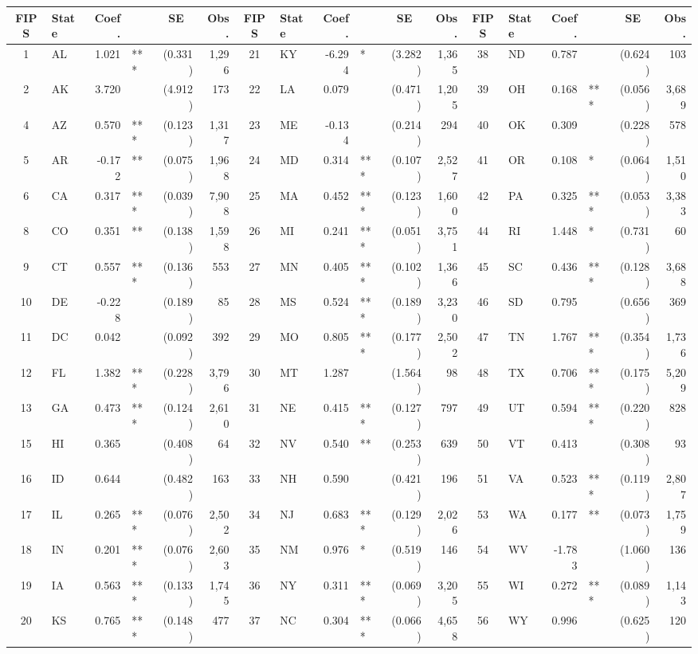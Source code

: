 \begin{tabular}{c l r l r r | c l r l r r | c l r l r r}
\hline
FIPS & State & Coef. & & \multicolumn{1}{c}{SE} & Obs. & FIPS & State & Coef. & & \multicolumn{1}{c}{SE} & Obs. & FIPS & State & Coef. & & \multicolumn{1}{c}{SE} & Obs. \\
\hline
1 & AL & 1.021 & *** & (0.331) & 1,296 & 21 & KY & -6.294 & * & (3.282) & 1,365 & 38 & ND & 0.787 &  & (0.624) & 103 \\
2 & AK & 3.720 &  & (4.912) & 173 & 22 & LA & 0.079 &  & (0.471) & 1,205 & 39 & OH & 0.168 & *** & (0.056) & 3,689 \\
4 & AZ & 0.570 & *** & (0.123) & 1,317 & 23 & ME & -0.134 &  & (0.214) & 294 & 40 & OK & 0.309 &  & (0.228) & 578 \\
5 & AR & -0.172 & ** & (0.075) & 1,968 & 24 & MD & 0.314 & *** & (0.107) & 2,527 & 41 & OR & 0.108 & * & (0.064) & 1,510 \\
6 & CA & 0.317 & *** & (0.039) & 7,908 & 25 & MA & 0.452 & *** & (0.123) & 1,600 & 42 & PA & 0.325 & *** & (0.053) & 3,383 \\
8 & CO & 0.351 & ** & (0.138) & 1,598 & 26 & MI & 0.241 & *** & (0.051) & 3,751 & 44 & RI & 1.448 & * & (0.731) & 60 \\
9 & CT & 0.557 & *** & (0.136) & 553 & 27 & MN & 0.405 & *** & (0.102) & 1,366 & 45 & SC & 0.436 & *** & (0.128) & 3,688 \\
10 & DE & -0.228 &  & (0.189) & 85 & 28 & MS & 0.524 & *** & (0.189) & 3,230 & 46 & SD & 0.795 &  & (0.656) & 369 \\
11 & DC & 0.042 &  & (0.092) & 392 & 29 & MO & 0.805 & *** & (0.177) & 2,502 & 47 & TN & 1.767 & *** & (0.354) & 1,736 \\
12 & FL & 1.382 & *** & (0.228) & 3,796 & 30 & MT & 1.287 &  & (1.564) & 98 & 48 & TX & 0.706 & *** & (0.175) & 5,209 \\
13 & GA & 0.473 & *** & (0.124) & 2,610 & 31 & NE & 0.415 & *** & (0.127) & 797 & 49 & UT & 0.594 & *** & (0.220) & 828 \\
15 & HI & 0.365 &  & (0.408) & 64 & 32 & NV & 0.540 & ** & (0.253) & 639 & 50 & VT & 0.413 &  & (0.308) & 93 \\
16 & ID & 0.644 &  & (0.482) & 163 & 33 & NH & 0.590 &  & (0.421) & 196 & 51 & VA & 0.523 & *** & (0.119) & 2,807 \\
17 & IL & 0.265 & *** & (0.076) & 2,502 & 34 & NJ & 0.683 & *** & (0.129) & 2,026 & 53 & WA & 0.177 & ** & (0.073) & 1,759 \\
18 & IN & 0.201 & *** & (0.076) & 2,603 & 35 & NM & 0.976 & * & (0.519) & 146 & 54 & WV & -1.783 &  & (1.060) & 136 \\
19 & IA & 0.563 & *** & (0.133) & 1,745 & 36 & NY & 0.311 & *** & (0.069) & 3,205 & 55 & WI & 0.272 & *** & (0.089) & 1,143 \\
20 & KS & 0.765 & *** & (0.148) & 477 & 37 & NC & 0.304 & *** & (0.066) & 4,658 & 56 & WY & 0.996 &  & (0.625) & 120 \\
\hline
\end{tabular}
